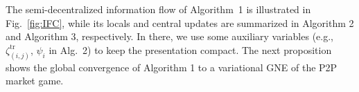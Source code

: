 \documentclass{IEEEtran}  %
\newcommand{\mc}{\mathcal}
\newcommand{\0}{\mathbf{0}}
\newcommand{\1}{\mathbf{1}}
\begin{document}
%

The semi-decentralized information flow of Algorithm~1 is illustrated in Fig.~\ref{fig:IFC}, {while its locals and central updates are summarized  in Algorithm 2 and Algorithm 3, respectively. In there, we use some auxiliary variables (e.g., $\zeta^{\text{tr}}_{(i,j)}$, $\psi_i$ in Alg.~2) to keep the presentation compact. }  
%
The next proposition shows the global convergence of Algorithm 1 to a variational GNE of the P2P market game. 
\end{document}
